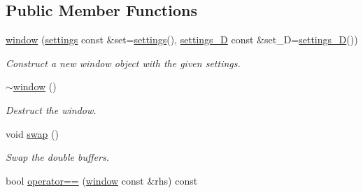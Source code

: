 \subsection*{Public Member Functions}
\begin{DoxyCompactItemize}
\item 
\hyperlink{classgfx_1_1window_acb96d8b2a517dd068069932792b60ce1}{window} (\hyperlink{classgfx_1_1window_1_1settings}{settings} const \&set=\hyperlink{classgfx_1_1window_1_1settings}{settings}(), \hyperlink{classgfx_1_1window_1_1settings__3D}{settings\-\_\-D} const \&set\-\_\-D=\hyperlink{classgfx_1_1window_1_1settings__3D}{settings\-\_\-D}())
\begin{DoxyCompactList}\small\item\em Construct a new window object with the given settings. \end{DoxyCompactList}\item 
\hypertarget{classgfx_1_1window_a73e6dbb43ad43fb17b8de80f2628c0f8}{\hyperlink{classgfx_1_1window_a73e6dbb43ad43fb17b8de80f2628c0f8}{$\sim$window} ()}\label{classgfx_1_1window_a73e6dbb43ad43fb17b8de80f2628c0f8}

\begin{DoxyCompactList}\small\item\em Destruct the window. \end{DoxyCompactList}\item 
void \hyperlink{classgfx_1_1window_a276ca46d49627c6880eeb568f72044f6}{swap} ()
\begin{DoxyCompactList}\small\item\em Swap the double buffers. \end{DoxyCompactList}\item 
\hypertarget{classgfx_1_1window_a4597ab67e0187c2fa3ceb977643f7dc5}{bool \hyperlink{classgfx_1_1window_a4597ab67e0187c2fa3ceb977643f7dc5}{operator==} (\hyperlink{classgfx_1_1window}{window} const \&rhs) const }\label{classgfx_1_1window_a4597ab67e0187c2fa3ceb977643f7dc5}


\end{DoxyCompactItemize}
